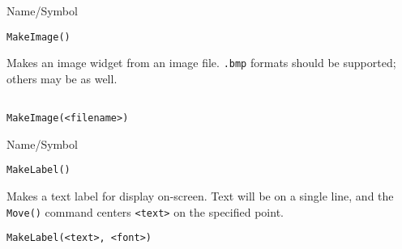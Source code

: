 \rl



\begin{desc}{Name/Symbol}
\item[Name/Symbol]	\verb+MakeImage()+

\item[Description]	Makes an image widget from an image file.
		\texttt{.bmp} formats should be supported; others may be as well.

\item[Usage]		
\begin{verbatim}

MakeImage(<filename>)
\end{verbatim}

\item[Example]	

\item[See Also]	
\end{desc}

\rl




\begin{desc}{Name/Symbol}
\item[Name/Symbol]	\verb+MakeLabel()+

\item[Description] Makes a text label for display on-screen. Text will
  be on a single line, and the \verb+Move()+ command centers
  \verb+<text>+ on the specified point.

\item[Usage]
\begin{verbatim}
MakeLabel(<text>, <font>)
\end{verbatim}

\item[Example]	

\item[See Also]	
\end{desc}

\rl

